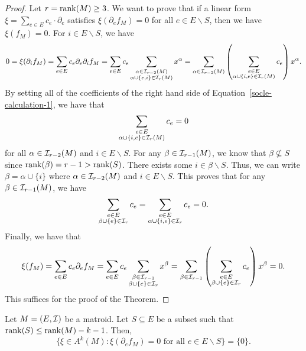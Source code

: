 \documentclass{puthesis-UG}
\begin{document}
\begin{proof}
	Let $r = \operatorname{rank} (M) \geq 3$. We want to prove that if a linear form $\xi = \sum_{e \in E} c_e \cdot \partial_e$ satisfies $\xi (\partial_e f_M) = 0$ for all $e \in E \backslash S$, then we have $\xi (f_M) = 0$. For $i \in E \backslash S$, we have 
	\begin{equation} \label{socle-calculation-1}
		0 = \xi (\partial_i f_M) = \sum_{e \in E} c_e \partial_e \partial_i f_M = \sum_{e \in E} c_e \sum_{\substack{\alpha \in \mathcal{I}_{r-2}(M) \\ \alpha \cup \{e,i\} \in \mathcal{I}_r (M)}} x^\alpha = \sum_{\alpha \in \mathcal{I}_{r-2}(M)} \left ( \sum_{\substack{e \in E \\ \alpha \cup \{i, e\} \in \mathcal{I}_r(M)}} c_e \right ) x^\alpha. 
	\end{equation}
	By setting all of the coefficients of the right hand side of Equation~\ref{socle-calculation-1}, we have that 
	\[
		\sum_{\substack{e \in E \\ \alpha \cup \{i, e\} \in \mathcal{I}_r (M)}} c_e = 0
	\]
	for all $\alpha \in \mathcal{I}_{r-2}(M)$ and $i \in E \backslash S$. For any $\beta \in \mathcal{I}_{r-1}(M)$, we know that $\beta \not \subseteq S$ since $\operatorname{rank} (\beta) = r-1 > \operatorname{rank} (S)$. There exists some $i \in \beta \backslash S$. Thus, we can write $\beta = \alpha \cup \{i\}$ where $\alpha \in \mathcal{I}_{r-2}(M)$ and $i \in E \backslash S$. This proves that for any $\beta \in \mathcal{I}_{r-1}(M)$, we have
	\[
		\sum_{\substack{e \in E \\ \beta \cup \{e\} \in \mathcal{I}_{r}}} c_e = \sum_{\substack{e \in E \\ \alpha \cup \{i, e\} \in \mathcal{I}_{r}}} c_e = 0.
	\]
	Finally, we have that 
	\[
		\xi(f_M) = \sum_{e \in E} c_e \partial_e f_M = \sum_{e \in E} c_e \sum_{\substack{\beta \in \mathcal{I}_{r-1} \\ \beta \cup \{e\} \in \mathcal{I}_r}} x^\beta = \sum_{\beta \in \mathcal{I}_{r-1}} \left ( \sum_{\substack{e \in E \\ \beta \cup \{e\} \in \mathcal{I}_r}} c_e \right ) x^\beta = 0.
	\]
	This suffices for the proof of the Theorem. 
\end{proof}

\begin{thm}
	Let $M = (E, \mathcal{I})$ be a matroid. Let $S \subseteq E$ be a subset such that $\operatorname{rank}(S) \leq \operatorname{rank}(M) - k - 1$. Then, 
	\[
		\{\xi \in A^k(M) : \xi (\partial_e f_M) = 0 \text{ for all } e \in E \backslash S\} = \{0\}.
	\]
\end{thm}
\end{document}
